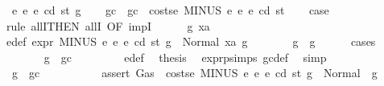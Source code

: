 \begin{isabellebody}
\ {\isacharparenleft}{\kern0pt}{}{}\ e{}\ e{}\ e\ cd\ st\ g{\isacharparenright}{\kern0pt}\isanewline
\ \ \isamarkupfalse%
\ gc\ \ {\isachardoublequoteopen}gc\ {\isacharequal}{\kern0pt}\ costs\isactrlsub e\ {\isacharparenleft}{\kern0pt}MINUS\ e{}\ e{}{\isacharparenright}{\kern0pt}\ e\ cd\ st{\isachardoublequoteclose}\isanewline
\ \ \isamarkupfalse%
\ {\isacharquery}{\kern0pt}case\isanewline
\ \ \isamarkupfalse%
\ {\isacharparenleft}{\kern0pt}rule\ allI{\isacharbrackleft}{\kern0pt}THEN\ allI{\isacharcomma}{\kern0pt}\ OF\ impI{\isacharbrackright}{\kern0pt}{\isacharparenright}{\kern0pt}\isanewline
\ \ \ \ \isamarkupfalse%
\ g{}\ xa\ \isamarkupfalse%
\ e{\isacharunderscore}{\kern0pt}def{\isacharcolon}{\kern0pt}\ {\isachardoublequoteopen}expr\ {\isacharparenleft}{\kern0pt}MINUS\ e{}\ e{}{\isacharparenright}{\kern0pt}\ e\ cd\ st\ g\ {\isacharequal}{\kern0pt}\ Normal\ {\isacharparenleft}{\kern0pt}xa{\isacharcomma}{\kern0pt}\ g{}{\isacharparenright}{\kern0pt}{\isachardoublequoteclose}\isanewline
\ \ \ \ \isamarkupfalse%
\ \isamarkupfalse%
\ {\isachardoublequoteopen}g{}\ {\isasymle}\ g{\isachardoublequoteclose}\isanewline
\ \ \ \ \isamarkupfalse%
\ {\isacharparenleft}{\kern0pt}cases{\isacharparenright}{\kern0pt}\isanewline
\ \ \ \ \ \ \isamarkupfalse%
\ {\isachardoublequoteopen}g\ {\isasymle}\ gc{\isachardoublequoteclose}\isanewline
\ \ \ \ \ \ \isamarkupfalse%
\ {}{}{\isacharparenleft}{\kern0pt}{}{\isacharparenright}{\kern0pt}\ e{\isacharunderscore}{\kern0pt}def\ \isamarkupfalse%
\ {\isacharquery}{\kern0pt}thesis\ \isamarkupfalse%
\ expr{\isachardot}{\kern0pt}psimps{\isacharparenleft}{\kern0pt}{}{}{\isacharparenright}{\kern0pt}\ gc{\isacharunderscore}{\kern0pt}def\ \isamarkupfalse%
\ simp\isanewline
\ \ \ \ \isamarkupfalse%
\isanewline
\ \ \ \ \ \ \isamarkupfalse%
\ {\isachardoublequoteopen}{\isasymnot}\ g\ {\isasymle}\ gc{\isachardoublequoteclose}\isanewline
\ \ \ \ \ \ \isamarkupfalse%
\ \isamarkupfalse%
\ {\isacharasterisk}{\kern0pt}{\isacharcolon}{\kern0pt}\ {\isachardoublequoteopen}assert\ Gas\ {\isacharparenleft}{\kern0pt}{\isacharparenleft}{\kern0pt}{\isacharless}{\kern0pt}{\isacharparenright}{\kern0pt}\ {\isacharparenleft}{\kern0pt}costs\isactrlsub e\ {\isacharparenleft}{\kern0pt}MINUS\ e{}\ e{}{\isacharparenright}{\kern0pt}\ e\ cd\ st{\isacharparenright}{\kern0pt}{\isacharparenright}{\kern0pt}\ g\ {\isacharequal}{\kern0pt}\ Normal\ {\isacharparenleft}{\kern0pt}{\isacharparenleft}{\kern0pt}{\isacharparenright}{\kern0pt}{\isacharcomma}{\kern0pt}\ g{\isacharparenright}{\kern0pt}{\isachardoublequoteclose}\ \isamarkupfalse%

\end{isabellebody}
